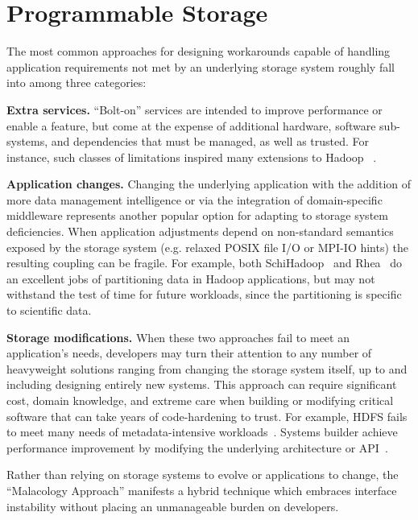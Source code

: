 \section{Programmable Storage}
\label{sec:progly}

The most common approaches for designing workarounds capable of handling application requirements not met by an underlying storage system roughly fall into among three categories:

{\bf Extra services.} ``Bolt-on'' services are intended to improve performance
or enable a feature, but come at the expense of additional hardware, software
sub-systems, and dependencies that must be managed, as well as trusted.
For instance, such classes of limitations inspired many extensions to Hadoop
~\cite{bu:vldb2010-haloop, ekanayake:hpdc2010-twister,
ekanayake:escience2008-eglmapreduce, mihailescu:hotstorage2012-mixapart}.

{\bf Application changes.} Changing the underlying application with the addition of
 more data management intelligence or via the integration of domain-specific middleware
 represents another popular option for adapting to storage system deficiencies. 
 When application adjustments depend on non-standard semantics exposed by the storage
system (e.g. relaxed POSIX file I/O or MPI-IO hints) the resulting coupling 
can be fragile.
For example, both SchiHadoop~\cite{buck:hpc2011-scihadoop} and Rhea~\cite{gkantsidis:nsdi2013-rhea} do
an excellent jobs of partitioning data in Hadoop applications, but may not
withstand the test of time for future workloads, since the partitioning is
specific to scientific data.

{\bf Storage modifications.} When these two approaches fail to meet an
application's needs, developers may turn their attention to any number of
heavyweight solutions ranging from changing the storage system itself, up to
and including designing entirely new systems. This approach can require
significant cost, domain knowledge, and extreme care when building or
modifying critical software that can take years of code-hardening to trust.
For example, HDFS fails to meet many needs 
of metadata-intensive workloads~\cite{shvachko:login2012-hdfs-scalability}.
Systems builder achieve performance improvement by modifying the underlying
architecture or API~\cite{balmin:sigmod2012-clydesdale}.

Rather than relying on storage systems to evolve or applications to
change, the ``Malacology Approach''
manifests a hybrid technique which embraces interface instability without placing
an unmanageable burden on developers.

